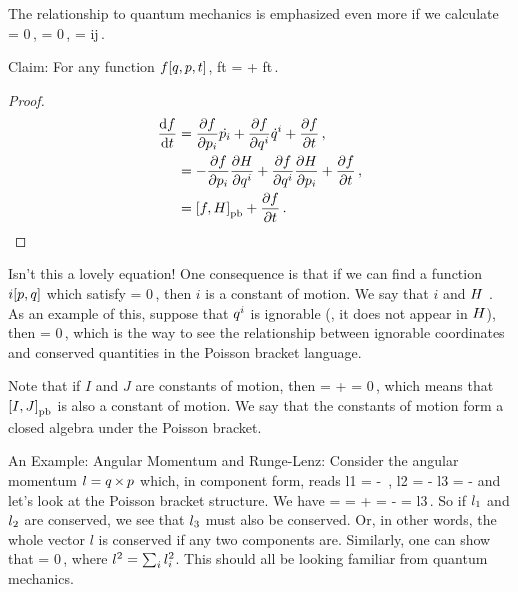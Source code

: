 The relationship to quantum mechanics is emphasized even more if we calculate
\beq
{} = 0\,,\qquad
{} = 0\,,\qquad
{} = \mkron ij\,.
\eeq

Claim: For any function $f\!\left[{q, p, t}\right]$,
\beq
\xod ft =  + \xpd ft\,.
\eeq
\begin{proof}
\begin{align*}
\dfrac{\text{d}{f}}{\text{d}{t}} &= \dfrac{\partial{f}}{\partial{{p}_{i}}}\dot{{p}_{i}} 
            + \dfrac{\partial{f}}{\partial{{q}^{i}}}{\dot{q}}^{i}
            + \dfrac{\partial{f}}{\partial{t}}\,,\\
        &= - \dfrac{\partial{f}}{\partial{{p}_{i}}}\dfrac{\partial{H}}{\partial{{q}^{i}}}
           + \dfrac{\partial{f}}{\partial{{q}^{i}}}\dfrac{\partial{H}}{\partial{{p}_{i}}}
           + \dfrac{\partial{f}}{\partial{t}}\,,\\
        &= \left[{f,H}\right]_{\text{pb}} + \dfrac{\partial{f}}{\partial{t}}\,.
\end{align*}
\end{proof}

Isn't this a lovely equation! One consequence is that if we can find a function $i\!\left[{p,q}\right]$ which satisfy
\beq
{} = 0\,,
\eeq
then $i$ is a constant of motion. We say that $i$ and $H$ . As an example of this, suppose that ${q}^{i}$ is ignorable (\ie, it does not appear in $H$), then
\beq
{} = 0\,,
\eeq
which is the way to see the relationship between ignorable coordinates and conserved quantities in the Poisson bracket language.

Note that if $I$ and $J$ are constants of motion, then 
\beq
{} =  +  = 0\,,
\eeq
which means that $\left[{I,J}\right]_{\text{pb}}$ is also a constant of motion. We say that the constants of motion form a closed algebra under the Poisson bracket.


An Example: Angular Momentum and Runge-Lenz: Consider the angular momentum $l = q\operatorname{\times}p$ which, in component form, reads
\beq
\covec l1 =  - \,,\qquad
\covec l2 =  - \qquad{}\qquad
\covec l3 =  - 
\eeq
and let's look at the Poisson bracket structure. We have
\beq
{} 
    = 
    =  + 
    =  - 
    = \covec l3\,.
\eeq
So if ${l}_{1}$ and ${l}_{2}$ are conserved, we see that ${l}_{3}$ must also be conserved. Or, in other words, the whole vector $l$ is conserved if any two components are. Similarly, one can show that 
\beq
{} = 0\,,
\eeq
where $l^2 = \sum_i{l}_{i}^2$. This should all be looking familiar from quantum mechanics.


